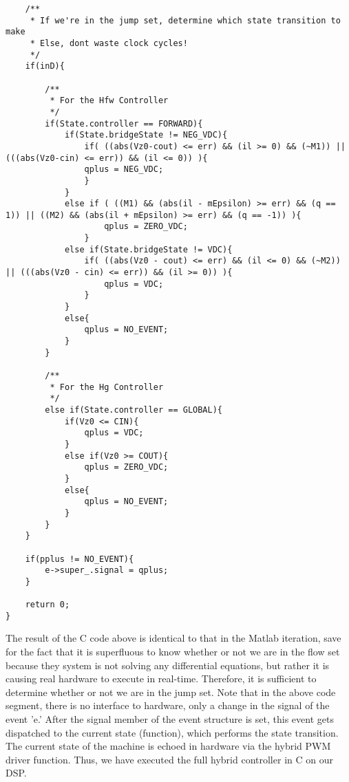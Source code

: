 \begin{lstlisting}
    /**
     * If we're in the jump set, determine which state transition to make
     * Else, dont waste clock cycles!
     */
    if(inD){

        /**
         * For the Hfw Controller
         */
        if(State.controller == FORWARD){    
            if(State.bridgeState != NEG_VDC){
                if( ((abs(Vz0-cout) <= err) && (il >= 0) && (~M1)) || (((abs(Vz0-cin) <= err)) && (il <= 0)) ){
                qplus = NEG_VDC;
                }
            }
            else if ( ((M1) && (abs(il - mEpsilon) >= err) && (q == 1)) || ((M2) && (abs(il + mEpsilon) >= err) && (q == -1)) ){
                    qplus = ZERO_VDC;
                }
            else if(State.bridgeState != VDC){
                if( ((abs(Vz0 - cout) <= err) && (il <= 0) && (~M2)) || (((abs(Vz0 - cin) <= err)) && (il >= 0)) ){
                    qplus = VDC;
                }
            }
            else{
                qplus = NO_EVENT;                
            }
        }

        /**
         * For the Hg Controller
         */
        else if(State.controller == GLOBAL){
            if(Vz0 <= CIN){
                qplus = VDC;
            }
            else if(Vz0 >= COUT){
                qplus = ZERO_VDC;
            }
            else{
                qplus = NO_EVENT;
            }
        }
    }

    if(pplus != NO_EVENT){
        e->super_.signal = qplus;
    }

    return 0;
}
\end{lstlisting}


The result of the C code above is identical to that in the Matlab iteration, save for the fact that it is superfluous to know whether or not we are in the flow set because they system is not solving any differential equations, but rather it is causing real hardware to execute in real-time.  Therefore, it is sufficient to determine whether or not we are in the jump set. Note that in the above code segment, there is no interface to hardware, only a change in the signal of the event 'e.' After the signal member of the event structure is set, this event gets dispatched to the current state (function), which performs the state transition. The current state of the machine is echoed in hardware via the hybrid PWM driver function. Thus, we have executed the full hybrid controller in C on our DSP. 
 



